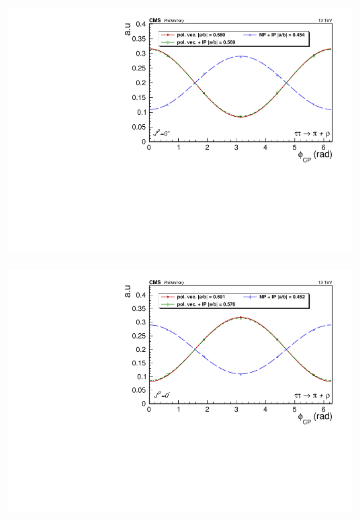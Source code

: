 \begin{figure}[]
  \begin{subfigure}[b]{0.5\linewidth}
    \centering
    \includegraphics[width=\linewidth]{Chapitre6/Images/RHOPION/RHOPION_even_gen.pdf} 
    \caption*{} 
    \vspace{10mm}
  \end{subfigure}%
  \begin{subfigure}[b]{0.5\linewidth}
    \centering
    \includegraphics[width=\linewidth]{Chapitre6/Images/RHOPION/RHOPION_odd_gen.pdf} 
    \caption*{} 
    \vspace{10mm}
  \end{subfigure} 


\end{figure}
